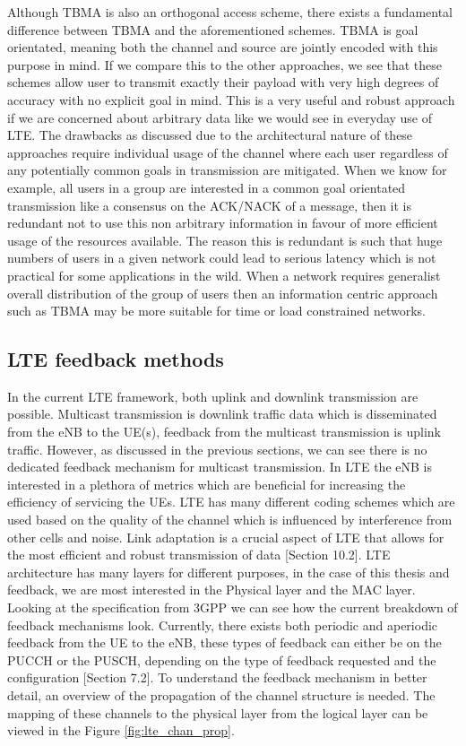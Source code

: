 \documentclass{article}
\begin{document}
Although TBMA is also an orthogonal access scheme, there exists a fundamental difference between TBMA and the aforementioned schemes. TBMA is goal orientated, meaning both the channel and source are jointly encoded with this purpose in mind. If we compare this to the other approaches, we see that these schemes allow user to transmit exactly their payload with very high degrees of accuracy with no explicit goal in mind. This is a very useful and robust approach if we are concerned about arbitrary data like we would see in everyday use of LTE.  The drawbacks as discussed due to the architectural nature of these approaches require individual usage of the channel where each user regardless of any potentially common goals in transmission are mitigated. When we know for example, all users in a group are interested in a common goal orientated transmission like a consensus on the ACK/NACK of a message, then it is redundant not to use this non arbitrary information in favour of more efficient usage of the resources available. The reason this is redundant is such that huge numbers of users in a given network could lead to serious latency which is not practical for some applications in the wild. When a network requires generalist overall distribution of the group of users then an information centric approach such as TBMA may be more suitable for time or load constrained networks.

\subsection{LTE feedback methods}\label{lte_feedback_current}

In the current LTE framework, both uplink and downlink transmission are possible. Multicast transmission is downlink traffic data which is disseminated from the eNB to the UE(s), feedback from the multicast transmission is uplink traffic. However, as discussed in the previous sections, we can see there is no dedicated feedback mechanism for multicast transmission. In LTE the eNB is interested in a plethora of metrics which are beneficial for increasing the efficiency of servicing the UEs. LTE has many different coding schemes which are used based on the quality of the channel which is influenced by interference from other cells and noise.  Link adaptation is a crucial aspect of LTE that allows for the most efficient and robust transmission of data \cite{umts_sesia}[Section 10.2]. LTE architecture has many layers for different purposes, in the case of this thesis and feedback, we are most interested in the Physical layer and the MAC layer. Looking at the specification from 3GPP we can see how the current breakdown of feedback mechanisms look. Currently, there exists both periodic and aperiodic feedback from the UE to the eNB, these types of feedback can either be on the PUCCH or the PUSCH, depending on the type of feedback requested and the configuration \cite{ETSITS136213}[Section 7.2]. To understand the feedback mechanism in better detail, an overview of the propagation of the channel structure is needed. The mapping of these channels to the physical layer from the logical layer can be viewed in the Figure \ref{fig:lte_chan_prop}.
\end{document}
